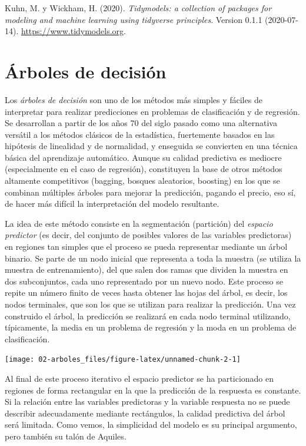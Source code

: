 \documentclass[
]{book}
\theoremstyle{break}
\theoremstyle{definition}
\theoremstyle{definition}
\theoremstyle{definition}
\theoremstyle{remark}
\begin{document}
Kuhn, M. y Wickham, H. (2020). \emph{Tidymodels: a collection of packages for modeling and machine learning using tidyverse principles}. Version 0.1.1 (2020-07-14). \url{https://www.tidymodels.org}.

\hypertarget{trees}{%
\chapter{Árboles de decisión}\label{trees}}

Los \emph{árboles de decisión} son uno de los métodos más simples y fáciles de interpretar para realizar predicciones en problemas de clasificación y de regresión.
Se desarrollan a partir de los años 70 del siglo pasado como una alternativa versátil a los métodos clásicos de la estadística, fuertemente basados en las hipótesis de linealidad y de normalidad, y enseguida se convierten en una técnica básica del aprendizaje automático.
Aunque su calidad predictiva es mediocre (especialmente en el caso de regresión), constituyen la base de otros métodos altamente competitivos (bagging, bosques aleatorios, boosting) en los que se combinan múltiples árboles para mejorar la predicción, pagando el precio, eso sí, de hacer más difícil la interpretación del modelo resultante.

La idea de este método consiste en la segmentación (partición) del \emph{espacio predictor} (es decir, del conjunto de posibles valores de las variables predictoras) en regiones tan simples que el proceso se pueda representar mediante un árbol binario.
Se parte de un nodo inicial que representa a toda la muestra (se utiliza la muestra de entrenamiento), del que salen dos ramas que dividen la muestra en dos subconjuntos, cada uno representado por un nuevo nodo.
Este proceso se repite un número finito de veces hasta obtener las hojas del árbol, es decir, los nodos terminales, que son los que se utilizan para realizar la predicción.
Una vez construido el árbol, la predicción se realizará en cada nodo terminal utilizando, típicamente, la media en un problema de regresión y la moda en un problema de clasificación.

\begin{center}\texttt{[image: 02-arboles\_files/figure-latex/unnamed-chunk-2-1]} \end{center}

Al final de este proceso iterativo el espacio predictor se ha particionado en regiones de forma rectangular en la que la predicción de la respuesta es constante.
Si la relación entre las variables predictoras y la variable respuesta no se puede describir adecuadamente mediante rectángulos, la calidad predictiva del árbol será limitada.
Como vemos, la simplicidad del modelo es su principal argumento, pero también su talón de Aquiles.
\end{document}
